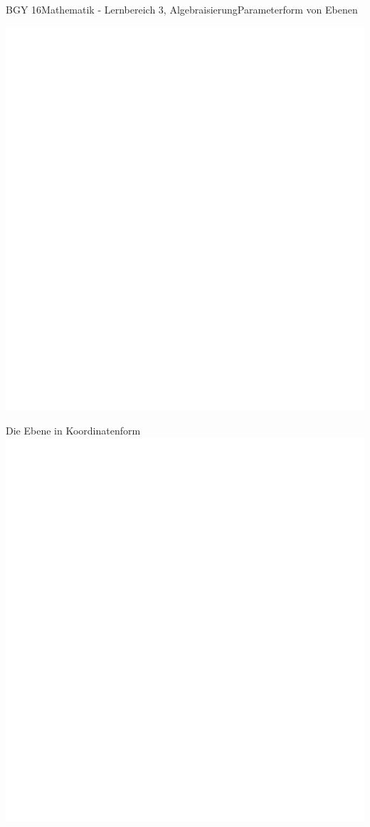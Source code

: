\documentclass[oneside,openany,headings=optiontotoc,11pt,numbers=noenddot]{scrreprt}
\begin{document}
\begin{worksheet}{BGY 16}{Mathematik - Lernbereich 3, Algebraisierung}{Parameterform von Ebenen}
\begin{framed}
			\includegraphics[scale=0.95]{../empty.jpg}
		\end{framed}
		\begin{framed}
			\tiny{\color{codegray}Die Ebene in Koordinatenform}\\
			\includegraphics[scale=0.5]{../empty.jpg}
		\end{framed}
	\end{worksheet}
\end{document}
